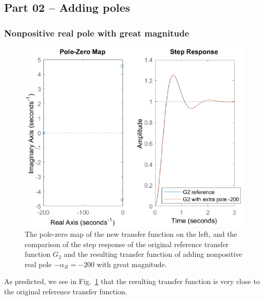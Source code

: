 \documentclass[12pt]{article}
\begin{document}
\subsection{Part 02 -- Adding poles}

\subsubsection{Nonpositive real pole with great magnitude}

\begin{figure}
    \centering
    \includegraphics{img/part02_nonpositive_real_pole.eps}
    \caption{The pole-zero map of the new transfer function on the left, and the comparison of the step response of the original reference transfer function $G_2$ and the resulting transfer function of adding nonpositive real pole $-\alpha_R = -200$ with great magnitude.}
    \label{fig:nonpositive real poles}
\end{figure}

As predicted, we see in Fig.~\ref{fig:nonpositive real poles} that the resulting transfer function is very close to the original reference transfer function.
\end{document}
